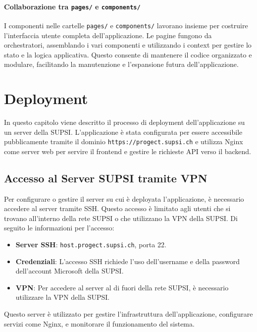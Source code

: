 \documentclass[twoside]{supsistudent}
\begin{document}
\subsubsection{Collaborazione tra \texttt{pages/} e \texttt{components/}}
I componenti nelle cartelle \texttt{pages/} e \texttt{components/} lavorano insieme per costruire l'interfaccia utente completa dell'applicazione. Le pagine fungono da orchestratori, assemblando i vari componenti e utilizzando i context per gestire lo stato e la logica applicativa. Questo consente di mantenere il codice organizzato e modulare, facilitando la manutenzione e l'espansione futura dell'applicazione.

\chapter{Deployment}

In questo capitolo viene descritto il processo di deployment dell'applicazione su un server della SUPSI. L'applicazione è stata configurata per essere accessibile pubblicamente tramite il dominio \texttt{https://progect.supsi.ch} e utilizza Nginx come server web per servire il frontend e gestire le richieste API verso il backend.

\section{Accesso al Server SUPSI tramite VPN}

Per configurare o gestire il server su cui è deployata l'applicazione, è necessario accedere al server tramite SSH. Questo accesso è limitato agli utenti che si trovano all'interno della rete SUPSI o che utilizzano la VPN della SUPSI. Di seguito le informazioni per l'accesso:

\begin{itemize}
  \item \textbf{Server SSH}: \texttt{host.progect.supsi.ch}, porta 22.
  \item \textbf{Credenziali}: L'accesso SSH richiede l'uso dell'username e della password dell'account Microsoft della SUPSI.
  \item \textbf{VPN}: Per accedere al server al di fuori della rete SUPSI, è necessario utilizzare la VPN della SUPSI.
\end{itemize}

Questo server è utilizzato per gestire l'infrastruttura dell'applicazione, configurare servizi come Nginx, e monitorare il funzionamento del sistema.
\end{document}
